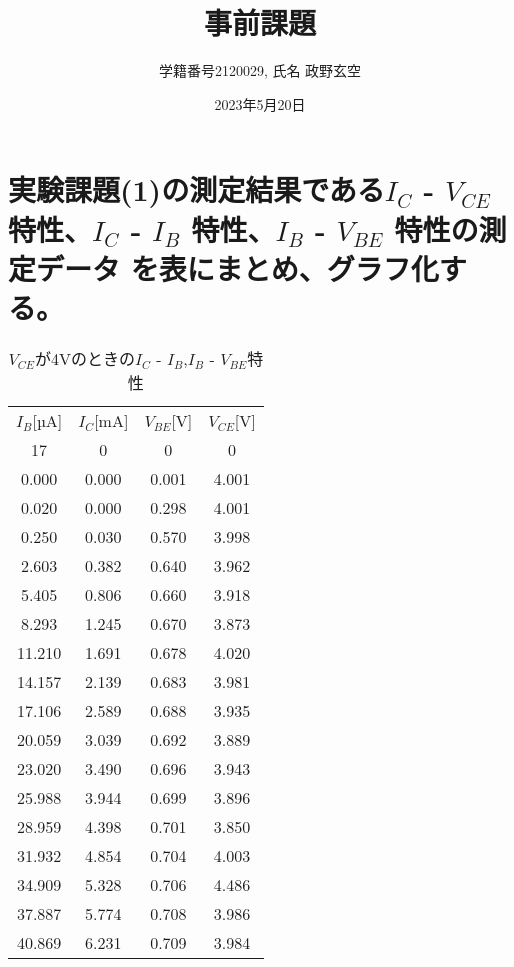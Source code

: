 \documentclass[a4j,10pt,dvipdfmx]{jarticle}
\author{学籍番号2120029, 氏名 政野玄空}
\date{2023年5月20日}
\begin{document}
\title{事前課題}
\maketitle
\section{実験課題(1)の測定結果である$I_C$ - $V_{CE}$ 特性、$I_C$ - $I_B$ 特性、$I_B$ - $V_{BE}$ 特性の測定データ
を表にまとめ、グラフ化する。}
\begin{table}[H]
\label{1}
\begin{center}
\caption{$V_{CE}$が4Vのときの$I_C$ - $I_B$,$I_B$ - $V_{BE}$特性}
\begin{tabular}{cccc} \\
\hline
$I_B$[µA] & $I_C$[mA] & $V_{BE}$[V] & $V_{CE}$[V] \\
17 & 0 & 0 & 0 \\
0.000  & 0.000  & 0.001  & 4.001  \\
0.020  & 0.000  & 0.298  & 4.001  \\
0.250  & 0.030  & 0.570  & 3.998  \\
2.603  & 0.382  & 0.640  & 3.962  \\
5.405  & 0.806  & 0.660  & 3.918  \\
8.293  & 1.245  & 0.670  & 3.873  \\
11.210  & 1.691  & 0.678  & 4.020  \\
14.157  & 2.139  & 0.683  & 3.981  \\
17.106  & 2.589  & 0.688  & 3.935  \\
20.059  & 3.039  & 0.692  & 3.889  \\
23.020  & 3.490  & 0.696  & 3.943  \\
25.988  & 3.944  & 0.699  & 3.896  \\
28.959  & 4.398  & 0.701  & 3.850  \\
31.932  & 4.854  & 0.704  & 4.003  \\
34.909  & 5.328  & 0.706  & 4.486  \\
37.887  & 5.774  & 0.708  & 3.986  \\
40.869 & 6.231 & 0.709 & 3.984 \\
 \hline
\end{tabular}
\end{center}
\end{table}
\end{document}
